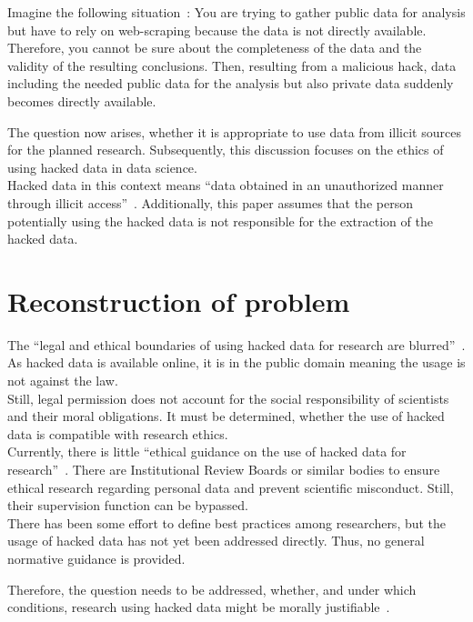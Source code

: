 
Imagine the following situation~\parencite[][1-2]{patreon}:
You are trying to gather public data for analysis but have to rely on web-scraping because the data is not directly available.
Therefore, you cannot be sure about the completeness of the data and the validity of the resulting conclusions.
Then, resulting from a malicious hack, data including the needed public data for the analysis but also private data suddenly becomes directly available.

The question now arises, whether it is appropriate to use data from illicit sources for the planned research.
Subsequently, this discussion focuses on the ethics of using hacked data in data science.\\
Hacked data in this context means ``data obtained in an unauthorized manner through illicit access''~\parencite[][744]{nature}.
Additionally, this paper assumes that the person potentially using the hacked data is not responsible for the extraction of the hacked data.

\section*{Reconstruction of problem}

The ``legal and ethical boundaries of using hacked data for research are blurred''~\parencite[][745]{nature}.
As hacked data is available online, it is in the public domain meaning the usage is not against the law.\\
Still, legal permission does not account for the social responsibility of scientists and their moral obligations.
It must be determined, whether the use of hacked data is compatible with research ethics.\\
Currently, there is little ``ethical guidance on the use of hacked data for research''~\parencite[][745]{nature}.
There are Institutional Review Boards or similar bodies to ensure ethical research regarding personal data and prevent scientific misconduct.
Still, their supervision function can be bypassed.\\
There has been some effort to define best practices among researchers, but the usage of hacked data has not yet been addressed directly.
Thus, no general normative guidance is provided.

Therefore, the question needs to be addressed, whether, and under which conditions, research using hacked data might be morally justifiable~\parencite[][745]{nature}.

